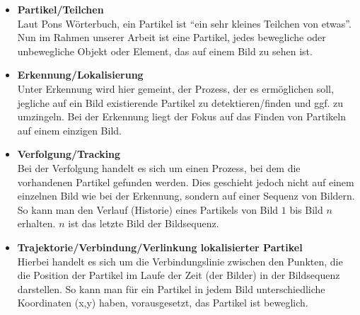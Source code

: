 \begin{itemize}
	\item \textbf{Partikel/Teilchen}\\
	Laut Pons Wörterbuch, ein Partikel ist ``ein sehr kleines Teilchen von etwas''. Nun im Rahmen unserer Arbeit ist eine Partikel, jedes bewegliche oder unbewegliche Objekt oder Element, das auf einem Bild zu sehen ist.
	
	\item \textbf{Erkennung/Lokalisierung}\\
	Unter Erkennung wird hier gemeint, der Prozess, der es ermöglichen soll, jegliche auf ein Bild existierende Partikel zu detektieren/finden und ggf. zu umzingeln. Bei der Erkennung liegt der Fokus auf das Finden von Partikeln auf einem einzigen Bild.
	 
	\item \textbf{Verfolgung/Tracking}\\
	Bei der Verfolgung handelt es sich um einen Prozess, bei dem die vorhandenen Partikel gefunden werden. Dies geschieht jedoch nicht auf einem einzelnen Bild wie bei der Erkennung, sondern auf einer Sequenz von Bildern. So kann man den Verlauf (Historie) eines Partikels von Bild $1$ bis Bild $n$ erhalten. $n$ ist das letzte Bild der Bildsequenz.

	
	\item \textbf{Trajektorie/Verbindung/Verlinkung lokalisierter Partikel}\\
	Hierbei handelt es sich um die Verbindungslinie zwischen den Punkten, die die Position der Partikel im Laufe der Zeit (der Bilder) in der Bildsequenz darstellen. So kann man für ein Partikel in jedem Bild unterschiedliche Koordinaten (x,y) haben, vorausgesetzt, das Partikel ist beweglich.
	
	
	
	
	
\end{itemize}

